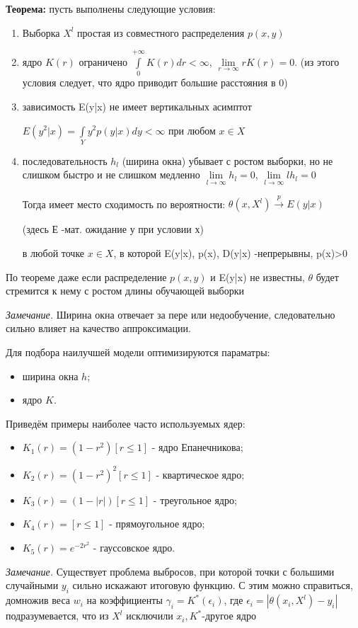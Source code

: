 \textbf{Теорема:}
пусть выполнены следующие условия:
\begin{enumerate}
    \item Выборка $X^l$ простая из совместного распределения $p(x,y)$
    \item ядро $K(r)$ ограничено $\displaystyle\int\limits_{0}^{+\infty} K(r)dr < \infty$, 
    $\lim\limits_{r \to \infty}  rK(r) =0$.
    (из этого условия следует, что ядро приводит большие расстояния в 0)
    \item зависимость E(y|x) не имеет вертикальных асимптот
    
    $E(y^2|x)=\displaystyle\int\limits_{Y} y^2p(y|x)dy < \infty$ при любом $x \in X$
    \item последовательность $h_l$ (ширина окна) убывает с ростом выборки, но не слишком быстро и не слишком медленно
    $\lim\limits_{l\to \infty} h_l=0$,
    $\lim\limits_{l\to \infty} l h_l=0$
    
    Тогда имеет место сходимость по вероятности:
    $\theta(x, X^l) \xrightarrow{p}E(y|x) $

(здесь Е -мат. ожидание у при условии х)
    
    в любой точке $x \in X$, в которой E(y|x),  p(x), D(y|x) -непрерывны, p(x)>0
\end{enumerate}

По теореме даже если распределение $p(x,y)$ и E(y|x) не известны, $\theta$ будет стремится к нему с ростом длины обучающей выборки


\textit{Замечание.} Ширина окна отвечает за пере или недообучение,
следовательно сильно влияет на качество аппроксимации. 



Для подбора наилучшей модели оптимизируются параматры:
\begin{itemize}
    \item ширина окна $h$;
    \item ядро $K$. 
\end{itemize}

 Приведём примеры наиболее часто используемых ядер:
\begin{itemize}
    \item $\displaystyle K_1(r) = (1-r^2)[r\le1]$ - ядро Епанечникова;
    \item $\displaystyle K_2(r) = (1-r^2)^2[r\le1]$ - квартическое ядро;
    \item $\displaystyle K_3(r) = (1-|r|)[r\le1]$ - треугольное ядро; 
    \item $\displaystyle K_4(r) = [r\le1]$ - прямоугольное ядро; \item $\displaystyle K_5(r) = e^{-2r^2}$ - гауссовское ядро.
\end{itemize}
\textit{Замечание.} Существует проблема выбросов, при которой точки с большими случайными $y_i$ сильно искажают итоговую функцию. С этим можно справиться, домножив веса $w_i$ на коэффициенты $\gamma_i = K^*(\epsilon_i)$, где $\epsilon_i =|\theta(x_i, X^l)-y_i|$ подразумевается, что из $X^l$ исключили $x_i, K^*$-другое ядро



